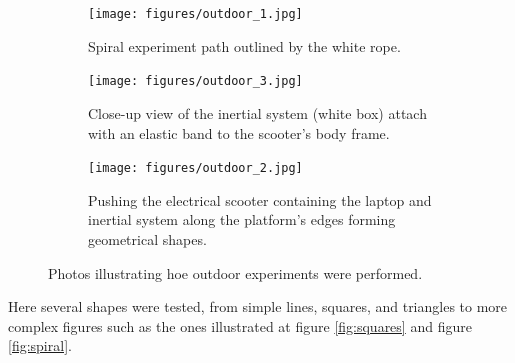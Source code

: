 \begin{figure}[!h]
  \centering
  \begin{subfigure}{0.8\textwidth}
    \centering
    \texttt{[image: figures/outdoor\_1.jpg]}
    \caption{ Spiral experiment path outlined by the white rope. }
    \label{fig:outdoor_1}
  \end{subfigure}

  \begin{subfigure}{0.40\textwidth}
    \centering
    \texttt{[image: figures/outdoor\_3.jpg]}
    \caption{ Close-up view of the inertial system (white box) attach with an elastic band to the scooter's body frame. }
    \label{fig:outdoor_2}
  \end{subfigure}
  \begin{subfigure}{0.40\textwidth}
    \centering
    \texttt{[image: figures/outdoor\_2.jpg]}
    \caption{ Pushing the electrical scooter containing the laptop and inertial system along the platform's edges forming geometrical shapes. }
    \label{fig:outdoor_3}
  \end{subfigure}
  \caption{ Photos illustrating hoe outdoor experiments were performed.}
  \label{fig:outdoor_experiments}
\end{figure}

Here several shapes were tested, from simple lines, squares, and triangles to more complex figures such as the ones illustrated at figure \ref{fig:squares} and figure \ref{fig:spiral}.

